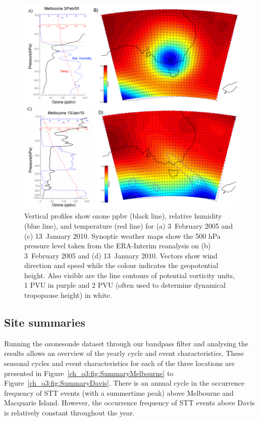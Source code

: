     \begin{figure}[!htbp]
      \includegraphics[width=\columnwidth]{Figures/Ozone/Cases}
      \caption{
	Vertical profiles show ozone ppbv (black line), relative humidity (blue line), and temperature (red line) for (a) 3~February 2005 and (c) 13~January 2010. Synoptic weather maps show the 500 hPa pressure level taken from the ERA-Interim reanalysis on (b) 3~February 2005 and (d) 13~January 2010. 
	Vectors show wind direction and speed while the colour indicates the geopotential height. 
	Also visible are the line contours of potential vorticity units, 1 PVU in purple and 2 PVU (often used to determine dynamical tropopause height) in white.}
      \label{ch_o3:fig:MelbourneCases}
    \end{figure}
    
  \subsection{Site summaries}
    Running the ozonesonde dataset through our bandpass filter and analysing the results allows an overview of the yearly cycle and event characteristics.
    These seasonal cycles and event characteristics for each of the three locations are presented in Figure~\ref{ch_o3:fig:SummaryMelbourne} to Figure~\ref{ch_o3:fig:SummaryDavis}.
    There is an annual cycle in the occurrence frequency of STT events (with a summertime peak) above Melbourne and Macquarie Island. However, the occurrence frequency of STT events above Davis is relatively constant throughout the year.

